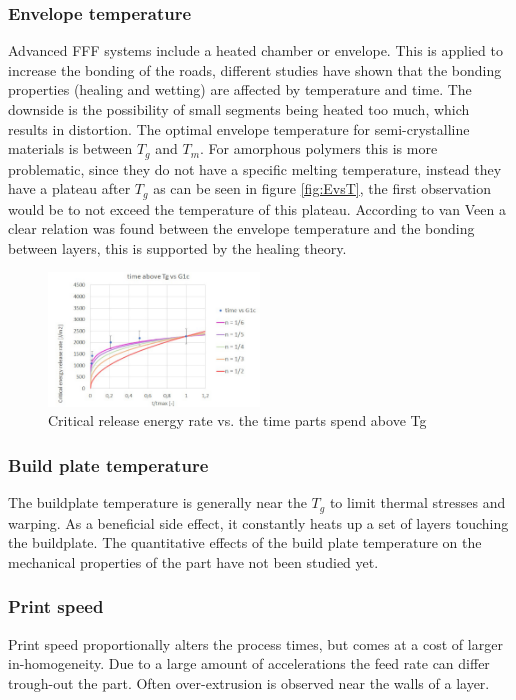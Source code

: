 \subsubsection {Envelope temperature }
Advanced FFF systems include a heated chamber or envelope. This is applied to increase the bonding of the roads, different studies \cite{Sun2008} \cite{Bellehumeur2004ModelingProcess} have shown that the bonding properties (healing and wetting) are affected by temperature and time. The downside is the possibility of small segments being heated too much, which results in distortion. The optimal envelope temperature for semi-crystalline materials is between $T_g$ and $T_m$. For amorphous polymers this is more problematic, since they do not have a specific melting temperature, instead they have a plateau after $T_g$ as can be seen in figure \ref{fig:EvsT}, the first observation would be to not exceed the temperature of this plateau.
According to van Veen \cite{VeenEnhancingTemperature} a clear relation was found between the envelope temperature and the bonding between layers, this is supported by the healing theory. 

\begin{figure}[H]
    \centering
    \includegraphics[width=0.5\textwidth]{chapter_2/figures/Dennisgraph.png}
    \caption{Critical release energy rate vs. the time parts spend above Tg\cite{VeenEnhancingTemperature}}
    \label{fig:Dennisgraph}
\end{figure}

\subsubsection {Build plate temperature }
 The buildplate temperature is generally near the $T_g$ to limit thermal stresses and warping. As a beneficial side effect, it constantly heats up a set of layers touching the buildplate.
The quantitative effects of the build plate temperature on the mechanical properties of the part have not been studied yet. 

\subsubsection {Print speed }
Print speed proportionally alters the process times,  but comes at a cost of larger in-homogeneity. Due to a large amount of accelerations the feed rate can differ trough-out the part. Often over-extrusion is observed near the walls of a layer.

